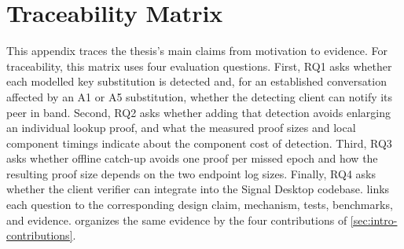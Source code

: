 \chapter{Traceability Matrix}\label{app:traceability}

This appendix traces the thesis's main claims from motivation to evidence. For traceability, this
matrix uses four evaluation questions. First, RQ1 asks whether each modelled key substitution is detected and,
for an established conversation affected by an A1 or A5 substitution, whether the detecting client can notify its peer in band. Second, RQ2
asks whether adding that detection avoids enlarging an individual lookup proof, and what the measured
proof sizes and local component timings indicate about the component cost of detection. Third, RQ3 asks
whether offline catch-up avoids one proof per missed epoch and how the resulting proof size depends on
the two endpoint log sizes.
Finally, RQ4 asks whether the client verifier can integrate into the Signal Desktop codebase.
 links each question to the corresponding design claim, mechanism, tests,
benchmarks, and evidence.  organizes the same evidence by the four
contributions of \cref{sec:intro-contributions}.

